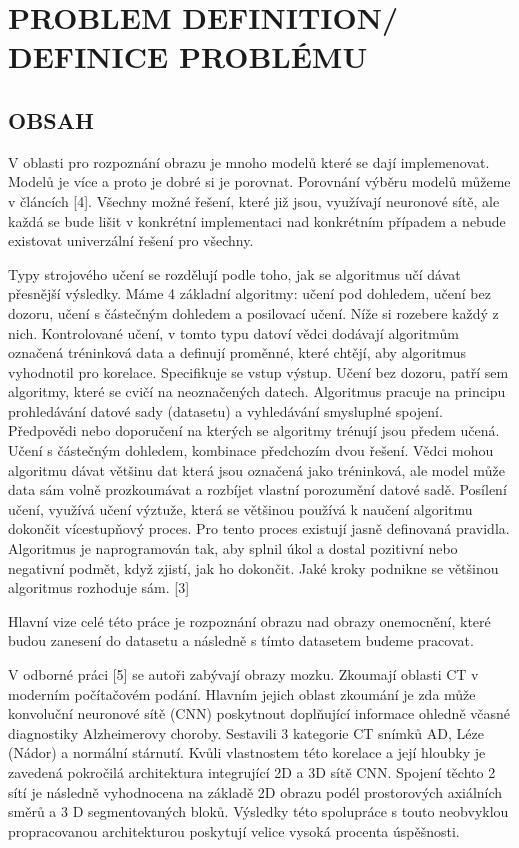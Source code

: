 \documentclass[journal]{IEEEtran}
\begin{document}
\section{PROBLEM DEFINITION/ DEFINICE PROBLÉMU}
\subsection{OBSAH}
V oblasti pro rozpoznání obrazu je mnoho modelů které se dají implemenovat. Modelů je více a proto je dobré si je porovnat. Porovnání výběru modelů můžeme v článcích [4]. Všechny možné řešení, které již jsou, využívají neuronové sítě, ale každá se bude lišit v konkrétní implementaci nad konkrétním případem a nebude existovat univerzální řešení pro všechny.

Typy strojového učení se rozdělují podle toho, jak se algoritmus učí dávat přesnější výsledky. Máme 4 základní algoritmy: učení pod dohledem, učení bez dozoru, učení s částečným dohledem a posilovací učení. Níže si rozebere každý z nich. 
Kontrolované učení, v tomto typu datoví vědci dodávají algoritmům označená tréninková data a definují proměnné, které chtějí, aby algoritmus vyhodnotil pro korelace. Specifikuje se vstup výstup. 
Učení bez dozoru, patří sem algoritmy, které se cvičí na neoznačených datech. Algoritmus pracuje na principu prohledávání datové sady (datasetu) a vyhledávání smysluplné spojení. Předpovědi nebo doporučení na kterých se algoritmy trénují jsou předem učená. 
Učení s částečným dohledem, kombinace předchozím dvou řešení. Vědci mohou algoritmu dávat většinu dat která jsou označená jako tréninková, ale model může data sám volně prozkoumávat a rozbíjet vlastní porozumění datové sadě. 
Posílení učení, využívá učení výztuže, která se většinou používá k naučení algoritmu dokončit vícestupňový proces. Pro tento proces existují jasně definovaná pravidla. Algoritmus je naprogramován tak, aby splnil úkol a dostal pozitivní nebo negativní podmět, když zjistí, jak ho dokončit. Jaké kroky podnikne se většinou algoritmus rozhoduje sám. [3]

Hlavní vize celé této práce je rozpoznání obrazu nad obrazy onemocnění, které budou zanesení do datasetu a následně s tímto datasetem budeme pracovat. 

V odborné práci [5] se autoři zabývají obrazy mozku. Zkoumají oblasti CT v moderním počítačovém podání. Hlavním jejich oblast zkoumání je zda může konvoluční neuronové sítě (CNN) poskytnout doplňující informace ohledně včasné diagnostiky Alzheimerovy choroby. Sestavili 3 kategorie CT snímků AD, Léze (Nádor) a normální stárnutí. Kvůli vlastnostem této korelace a její hloubky je zavedená pokročilá architektura integrující 2D a 3D sítě CNN. Spojení těchto 2 sítí je následně vyhodnocena na základě 2D obrazu podél prostorových axiálních směrů a 3 D segmentovaných bloků. Výsledky této spolupráce s touto neobvyklou propracovanou architekturou poskytují velice vysoká procenta úspěšnosti. 
\end{document}
